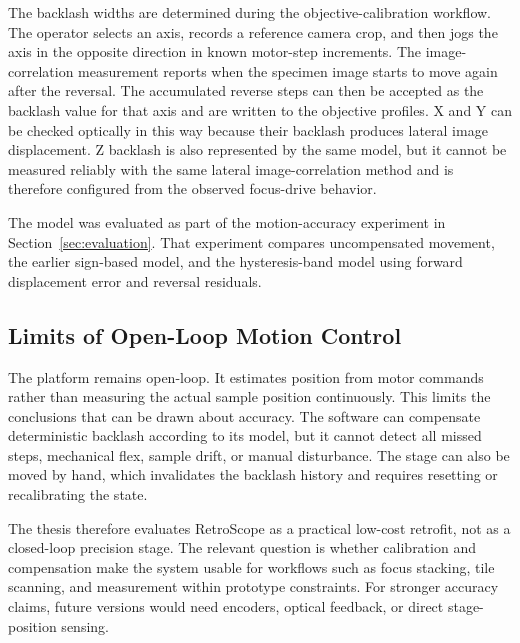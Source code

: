 The backlash widths are determined during the objective-calibration workflow. The operator selects an axis, records a reference camera crop, and then jogs the axis in the opposite direction in known motor-step increments. The image-correlation measurement reports when the specimen image starts to move again after the reversal. The accumulated reverse steps can then be accepted as the backlash value for that axis and are written to the objective profiles. X and Y can be checked optically in this way because their backlash produces lateral image displacement. Z backlash is also represented by the same model, but it cannot be measured reliably with the same lateral image-correlation method and is therefore configured from the observed focus-drive behavior.

The model was evaluated as part of the motion-accuracy experiment in Section~\ref{sec:evaluation}. That experiment compares uncompensated movement, the earlier sign-based model, and the hysteresis-band model using forward displacement error and reversal residuals.


\subsection{Limits of Open-Loop Motion Control}

The platform remains open-loop. It estimates position from motor commands rather than measuring the actual sample position continuously. This limits the conclusions that can be drawn about accuracy. The software can compensate deterministic backlash according to its model, but it cannot detect all missed steps, mechanical flex, sample drift, or manual disturbance. The stage can also be moved by hand, which invalidates the backlash history and requires resetting or recalibrating the state.

The thesis therefore evaluates RetroScope as a practical low-cost retrofit, not as a closed-loop precision stage. The relevant question is whether calibration and compensation make the system usable for workflows such as focus stacking, tile scanning, and measurement within prototype constraints. For stronger accuracy claims, future versions would need encoders, optical feedback, or direct stage-position sensing.

